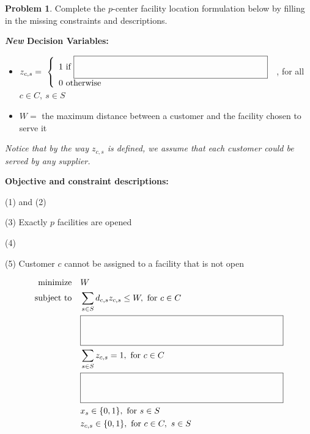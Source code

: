 \documentclass[11pt]{article}
\theoremstyle{definition}
\newtheorem{problem}{Problem}
\newcommand{\answerbox}[3]{%
  \fbox{%
    \begin{minipage}[#1]{#2}
      \hfill\vspace{#3}
    \end{minipage}
  }
}
\newcommand{\answerboxone}[2]{%
  \answerbox{#1}{6.0in}{#2} 
}
\newcommand{\minimize}{\text{minimize}}
\newcommand{\subjectto}{\text{subject to}}
\begin{document}
\begin{problem} 
Complete the $p$-center facility location formulation below by filling in the missing constraints and descriptions.

\begin{center}
\end{center}


\textbf{\emph{New} Decision Variables: }
\begin{itemize}
\item[] \def\arraystretch{1.8} $z_{c,s} = ~\left\{ \begin{array}{ll} 1 \text{ if} ~\answerbox{c}{3in}{.7cm}  
\\ 0 \text{ otherwise } \end{array} \right. $
, for all $c \in C,~ s \in S$
\item[] $W = $ the maximum distance between a customer and the facility chosen to serve it
\end{itemize}
\emph{Notice that by the way $z_{c,s}$ is defined, we assume that each customer could be served by any supplier.}


\medskip

\noindent \textbf{Objective and constraint descriptions:}

(1) and (2) \answerbox{c}{13.9cm}{3cm}

(3) %
 Exactly $p$ facilities are opened

(4) \answerboxone{c}{1cm}

(5) %
 Customer $c$ cannot be assigned to a facility that is not open

\vspace{-.5cm}
    \begin{align}
      \minimize \quad & W  \\
      \subjectto \quad 
 					   & \sum_{s \in S} d_{c,s}z_{c,s} \leq W, \text{ for } c \in C \\
 					   & \answerbox{c}{8cm}{1cm} \\
 				          & \sum_{s \in S} z_{c,s} = 1, \text{ for } c \in C \\
 					   & \answerbox{c}{8cm}{1cm} \\
                       & x_s \in \{0,1\}, \text{ for } s \in S \nonumber\\
                       & z_{c,s} \in \{0,1\}, \text{ for } c \in C, ~s \in S \nonumber
    \end{align}



\end{problem}
\end{document}
